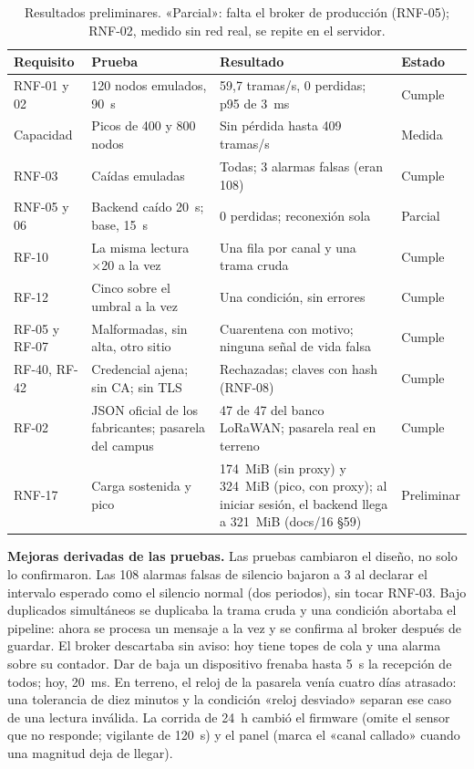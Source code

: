 \begin{table}[tb]
\centering\footnotesize
\begin{tablaseg}
\begin{tabular}{@{}L{2.1cm}L{4.1cm}L{5.2cm}L{1.6cm}@{}}
\toprule
\textbf{Requisito} & \textbf{Prueba} & \textbf{Resultado} & \textbf{Estado} \\
\midrule
RNF-01 y 02 & 120 nodos emulados, 90~s & 59,7 tramas/s, 0 perdidas; p95 de 3~ms & Cumple \\
Capacidad & Picos de 400 y 800 nodos & Sin pérdida hasta 409 tramas/s & Medida \\
RNF-03 & Caídas emuladas & Todas; 3 alarmas falsas (eran 108) & Cumple \\
RNF-05 y 06 & Backend caído 20~s; base, 15~s & 0 perdidas; reconexión sola & Parcial \\
RF-10 & La misma lectura ×20 a la vez & Una fila por canal y una trama cruda & Cumple \\
RF-12 & Cinco sobre el umbral a la vez & Una condición, sin errores & Cumple \\
RF-05 y RF-07 & Malformadas, sin alta, otro sitio & Cuarentena con motivo; ninguna señal de vida falsa & Cumple \\
RF-40, RF-42 & Credencial ajena; sin CA; sin TLS & Rechazadas; claves con hash (RNF-08) & Cumple \\
RF-02 & JSON oficial de los fabricantes; pasarela del campus & 47 de 47 del banco LoRaWAN; pasarela real en terreno & Cumple \\
RNF-17 & Carga sostenida y pico & 174~MiB (sin proxy) y 324~MiB (pico, con proxy); al iniciar sesión, el backend llega a 321~MiB (docs/16 §59) & Preliminar \\
\bottomrule
\end{tabular}
\end{tablaseg}
\caption[Resultados preliminares frente a los requerimientos]{Resultados preliminares. «Parcial»: falta el broker de producción (RNF-05); RNF-02, medido sin red real, se repite en el servidor.}
\label{tab:resultados}
\end{table}

\textbf{Mejoras derivadas de las pruebas.} Las pruebas cambiaron el diseño, no solo lo confirmaron. Las 108 alarmas falsas de silencio bajaron a 3 al declarar el intervalo esperado como el silencio normal (dos periodos), sin tocar RNF-03. Bajo duplicados simultáneos se duplicaba la trama cruda y una condición abortaba el pipeline: ahora se procesa un mensaje a la vez y se confirma al broker después de guardar. El broker descartaba sin aviso: hoy tiene topes de cola y una alarma sobre su contador. Dar de baja un dispositivo frenaba hasta 5~s la recepción de todos; hoy, 20~ms. En terreno, el reloj de la pasarela venía cuatro días atrasado: una tolerancia de diez minutos y la condición «reloj desviado» separan ese caso de una lectura inválida. La corrida de 24~h cambió el firmware (omite el sensor que no responde; vigilante de 120~s) y el panel (marca el «canal callado» cuando una magnitud deja de llegar).

